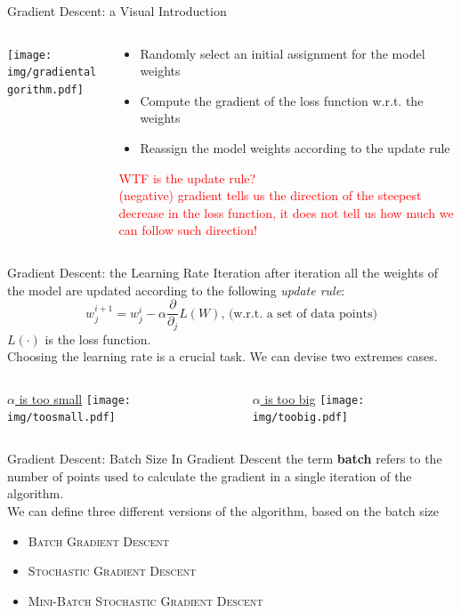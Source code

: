 \documentclass{beamer}
\begin{document}
\begin{frame}{Gradient Descent: a Visual Introduction}
\begin{columns}
\begin{column}{0.6\textwidth}
\texttt{[image: img/gradientalgorithm.pdf]}
\end{column}
\begin{column}{0.5\textwidth}
\begin{itemize}
\pause
\item Randomly select an initial assignment for the model weights
\pause
\item Compute the gradient of the loss function w.r.t. the weights
\pause
\item Reassign the model weights according to the update rule
\end{itemize}
\pause 
\large
\textcolor{red}{WTF is the update rule?} \\
\textcolor{red}{(negative) gradient tells us the direction of the steepest decrease in the loss
function, it does not tell us how much we can follow such direction!}
\end{column}
\end{columns}
\end{frame}


\begin{frame}{Gradient Descent: the Learning Rate}
Iteration after iteration all the weights of the model are updated according to the
following \textit{update rule}:
\[
	w_{j}^{i+1} = w_{j}^{i} - \alpha \frac{\partial}{\partial_j} L(W) \text{,  (w.r.t. a set of data points)}
\]
$L(\cdot)$ is the loss function.\\
\vskip 0.5cm
Choosing the learning rate is a crucial task. We can devise two extremes cases.
\vskip 0.5cm
\begin{columns}
\begin{column}{0.5\textwidth}
\underline{$\alpha$ is too small}
\texttt{[image: img/toosmall.pdf]}
\end{column}
\begin{column}{0.5\textwidth}
\underline{$\alpha$ is too big}
\texttt{[image: img/toobig.pdf]}
\end{column}
\end{columns}
\end{frame}




\begin{frame}{Gradient Descent: Batch Size}
In Gradient Descent the term \textbf{batch} refers to the number of points used to calculate the
gradient in a single iteration of the algorithm. \\
We can define three different versions of the algorithm, based on the batch size
\vskip 1cm
\begin{itemize}
\item \textsc{Batch Gradient Descent}
\item \textsc{Stochastic Gradient Descent}
\item \textsc{Mini-Batch Stochastic Gradient Descent}
\end{itemize}
\end{frame}
\end{document}
